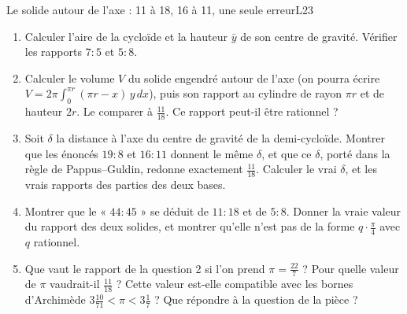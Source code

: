 \documentclass[11pt,a4paper]{article}
\begin{document}
\begin{exercice}{Le solide autour de l'axe : 11 à 18, 16 à 11, une seule erreur}{L2}{3}
\begin{enumerate}
\item Calculer l'aire de la cycloïde et la hauteur $\bar y$ de son centre de
  gravité. Vérifier les rapports $7 : 5$ et $5 : 8$.
\item Calculer le volume $V$ du solide engendré autour de l'axe (on pourra écrire
  $V = 2\pi\int_0^{\pi r}(\pi r - x)\,y\,dx$), puis son rapport au cylindre de rayon
  $\pi r$ et de hauteur $2r$. Le comparer à $\frac{11}{18}$. Ce rapport peut-il
  être rationnel ?
\item Soit $\delta$ la distance à l'axe du centre de gravité de la demi-cycloïde.
  Montrer que les énoncés $19 : 8$ et $16 : 11$ donnent le même $\delta$, et que ce
  $\delta$, porté dans la règle de Pappus--Guldin, redonne exactement
  $\frac{11}{18}$. Calculer le vrai $\delta$, et les vrais rapports des parties des
  deux bases.
\item Montrer que le « $44 : 45$ » se déduit de $11 : 18$ et de $5 : 8$. Donner la
  vraie valeur du rapport des deux solides, et montrer qu'elle n'est pas de la
  forme $q\cdot\frac{\pi}{4}$ avec $q$ rationnel.
\item Que vaut le rapport de la question 2 si l'on prend $\pi = \frac{22}{7}$ ? Pour
  quelle valeur de $\pi$ vaudrait-il $\frac{11}{18}$ ? Cette valeur est-elle
  compatible avec les bornes d'Archimède $3\frac{10}{71} < \pi < 3\frac17$ ? Que
  répondre à la question de la pièce ?
\end{enumerate}
\end{exercice}
\end{document}
